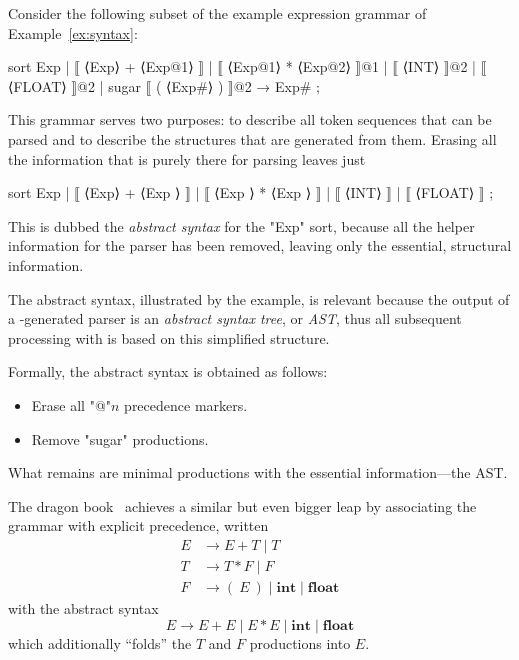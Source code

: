 \documentclass[11pt]{article} %
\begin{document}
\begin{example}\label{ex:ast}%
  Consider the following subset of the example expression grammar of Example~\ref{ex:syntax}:
  \begin{hacs}[xleftmargin=\parindent]
sort Exp  | ⟦ ⟨Exp⟩ + ⟨Exp@1⟩ ⟧
           | ⟦ ⟨Exp@1⟩ * ⟨Exp@2⟩ ⟧@1
           | ⟦ ⟨INT⟩ ⟧@2
           | ⟦ ⟨FLOAT⟩ ⟧@2
           | sugar ⟦ ( ⟨Exp#⟩ ) ⟧@2 → Exp# ;
  \end{hacs}
  This grammar serves two purposes: to describe all token sequences that can be parsed and to
  describe the structures that are generated from them. Erasing all the information that is
  purely there for parsing leaves just
  \begin{hacs}[xleftmargin=\parindent]
sort Exp  | ⟦ ⟨Exp⟩ + ⟨Exp  ⟩ ⟧
           | ⟦ ⟨Exp  ⟩ * ⟨Exp  ⟩ ⟧
           | ⟦ ⟨INT⟩ ⟧
           | ⟦ ⟨FLOAT⟩ ⟧ ;
  \end{hacs}
  This is dubbed the \emph{abstract syntax} for the "Exp" sort, because all the helper information
  for the parser has been removed, leaving only the essential, structural information.
\end{example}

The abstract syntax, illustrated by the example, is relevant because the output of a \HAX-generated
parser is an \emph{abstract syntax tree}, or \emph{AST}, thus all subsequent processing with \HAX is
based on this simplified structure.

Formally, the abstract syntax is obtained as follows:
\begin{itemize}
\item Erase all "@"$n$ precedence markers.
\item Remove "sugar" productions.
\end{itemize}
What remains are minimal productions with the essential information---the AST.

{\small\begin{remark}%
    The dragon book~\cite{Aho+:2006} achieves a similar but even bigger leap by associating the
    grammar with explicit precedence, written
    \begin{align*}
      E &→ E+T \mid T \\
      T &→ T*F \mid F \\
      F &→ (~E~) \mid \textbf{int} \mid \textbf{float}
    \end{align*}
    with the abstract syntax
    \begin{displaymath}
      E → E+E \mid E*E \mid \textbf{int} \mid \textbf{float}
    \end{displaymath}
    which additionally ``folds'' the $T$ and $F$ productions into $E$.
  \end{remark}}
\end{document}

